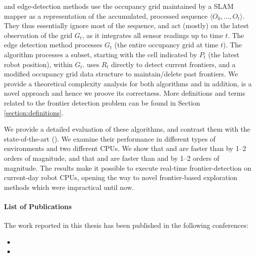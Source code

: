 \WFD and edge-detection methods use the occupancy grid
maintained by a SLAM mapper as a representation of the accumulated, processed sequence $\langle
O_0,\ldots,O_t\rangle$. They thus essentially ignore most of the sequence, and
act (mostly) on the latest observation of the grid $G_t$, as it integrates all
sensor readings up to time $t$. The edge detection method processes $G_t$ (the
entire occupancy grid at time $t$). The \WFD algorithm processes a subset,
starting with the cell indicated by $P_t$ (the latest robot position), within
$G_t$.  \FFD uses $R_t$ directly to detect current frontiers, and a modified
occupancy grid data structure to maintain/delete past frontiers.
We provide a theoretical complexity analysis for both algorithms and
in addition, \FFD is a novel approach and hence we proove its correctness. 
More definitions and terms related to the frontier detection problem can be
found in Section \ref{section:definitions}.

We provide a detailed evaluation of these algorithms, and contrast them 
with the state-of-the-art (\SOTA). %
We examine their performance in different types of environments and two different
CPUs. We show that \WFD and \WFDINC are faster than \SOTA by 1--2 orders of
magnitude, and that \FFD and \WFDIP are faster than \WFD and \WFDINC by 1--2
orders of magnitude.  The results make it possible to execute real-time
frontier-detection on current-day robot CPUs, opening the way to novel
frontier-based exploration methods which were impractical until now.

\paragraph{List of Publications}
The work reported in this thesis has been published in the following
conferences:
\begin{itemize}
  \item {}
  \item {}
\end{itemize}
